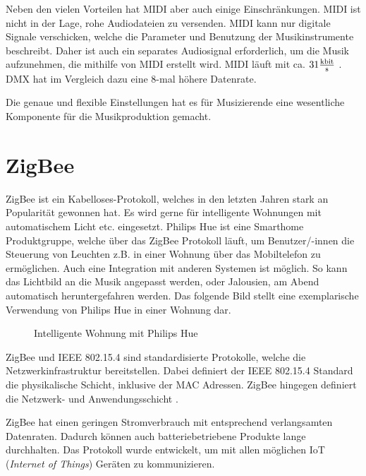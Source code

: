 Neben den vielen Vorteilen hat MIDI aber auch einige Einschränkungen. MIDI ist nicht in der Lage, rohe Audiodateien zu versenden. MIDI kann nur digitale Signale verschicken, welche die Parameter und Benutzung der Musikinstrumente beschreibt. Daher ist auch ein separates Audiosignal erforderlich, um die Musik aufzunehmen, die mithilfe von MIDI erstellt wird. MIDI läuft mit ca. $31 \frac{\SI{}{\kilo\bit}}{\SI{}{\s}}$ \cite[S. 1]{MIDI-DETAILED-SPECIFICATION}. DMX hat im Vergleich dazu eine 8-mal höhere Datenrate. 

Die genaue und flexible Einstellungen hat es für Musizierende eine wesentliche Komponente für die Musikproduktion gemacht.


\section{ZigBee}
ZigBee ist ein Kabelloses-Protokoll, welches in den letzten Jahren stark an Popularität gewonnen hat. Es wird gerne für intelligente Wohnungen mit automatischem Licht etc. eingesetzt. Philips Hue ist eine Smarthome Produktgruppe, welche über das ZigBee Protokoll läuft, um Benutzer/-innen die Steuerung von Leuchten z.B. in einer Wohnung über das Mobiltelefon zu ermöglichen. Auch eine Integration mit anderen Systemen ist möglich. So kann das Lichtbild an die Musik angepasst werden, oder Jalousien, am Abend automatisch heruntergefahren werden. Das folgende Bild stellt eine exemplarische Verwendung von Philips Hue in einer Wohnung dar.

\begin{figure}[H]
	\centering
	\caption{Intelligente Wohnung mit  Philips Hue}
\end{figure}


ZigBee und IEEE 802.15.4 sind standardisierte Protokolle, welche die Netzwerkinfrastruktur bereitstellen. Dabei definiert der IEEE 802.15.4 Standard die physikalische Schicht, inklusive der MAC Adressen. ZigBee hingegen definiert die Netzwerk- und Anwendungsschicht \cite[S.5]{GettingStartedWithZigBee}.

ZigBee hat einen geringen Stromverbrauch mit entsprechend verlangsamten Datenraten. Dadurch können auch batteriebetriebene Produkte lange durchhalten. Das Protokoll wurde entwickelt, um mit allen möglichen IoT (\emph{Internet of Things}) Geräten zu kommunizieren.

